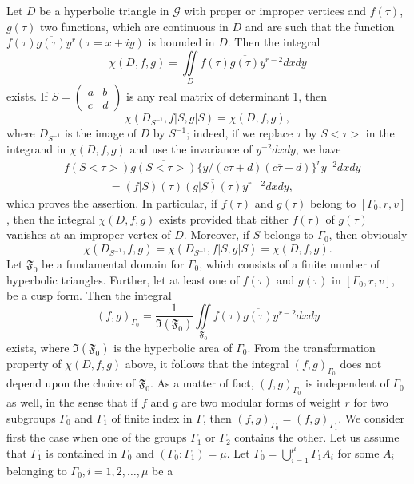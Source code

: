 Let $D$ be a hyperbolic triangle in $\mathscr{G}$ with proper or
improper vertices and $f(\tau)$, $g(\tau)$ two functions, which are
continuous in $D$ and are such that the function
$f(\tau)\overline{g(\tau)}y^r(\tau =x+iy)$ is bounded in $D$. Then the
integral 
$$
\chi(D,f,g) = \iint\limits_D  f(\tau) \overline{g(\tau)} y^{r-2} dx dy
$$
exists. If $S=\left(\begin{smallmatrix}
a&b\\c&d \end{smallmatrix}\right)$ is any real matrix of determinant
1, then 
$$
\chi(D_{S^{-1}},f|S, g|S) = \chi (D,f,g),
$$
where $D_{S^{-1}}$ is the image of $D$ by $S^{-1}$; indeed, if we
replace $\tau$ by $S<\tau>$ in the integrand in $\chi(D,f,g)$ and use
the invariance of $y^{-2}dx dy$, we have 
\begin{align*}
&f(S<\tau>) \overline{g(S<\tau>)} \{y/(c\tau+d)(c\overline{\tau}+d)\}^r
y^{-2} dx dy\\
&\qquad\qquad= (f|S) (\tau)\overline{(g|S)(\tau)} y^{r-2} dx dy, 
\end{align*}\pageoriginale 
which proves the assertion. In particular, if $f(\tau)$ and $g(\tau)$
belong to $[\Gamma_0, r, v]$, then the integral $\chi(D,f,g)$ exists
provided that either $f(\tau)$ of $g(\tau)$ vanishes at an improper
vertex of $D$. Moreover, if $S$ belongs to $\Gamma_0$, then obviously
$$
\chi(D_{S^{-1}},f,g)=\chi(D_{S^{-1}},f|S, g|S) = \chi (D,f,g).
$$
Let $\mathfrak{F}_0$ be a fundamental domain for $\Gamma_0$, which
consists of a finite number of hyperbolic triangles. Further, let at
least one of $f(\tau)$ and $g(\tau)$ in $[\Gamma_0,r,v]$, be a cusp
form. Then the integral 
$$
(f,g)_{\Gamma_0} = \frac{1}{\mathfrak{I}(\mathfrak{F_0})} 
\iint\limits_{\mathfrak{F}_0} f(\tau) \overline{g(\tau)} y^{r-2} dx dy
$$
exists, where $\mathfrak{I}(\mathfrak{F}_0)$ is the hyperbolic area of
$\Gamma_0$. From the transformation property of $\chi(D,f,g)$ above,
it follows that the integral $(f,g)_{\Gamma_0}$ does not depend upon
the choice of $\mathfrak{F}_0$. As a matter of fact,
$(f,g)_{\Gamma_0}$ is independent of $\Gamma_0$ as well, in the sense
that if $f$ and $g$ are two modular forms of weight $r$ for two
subgroups $\Gamma_0$ and $\Gamma_1$ of finite index in $\Gamma$, then
$(f,g)_{\Gamma_0}=(f,g)_{\Gamma_1}$. We consider first the case when
one of the groups $\Gamma_1$ or $\Gamma_2$ contains the other. Let us
assume that $\Gamma_1$ is contained in $\Gamma_0$ and
$(\Gamma_0:\Gamma_1)=\mu$. Let $\Gamma_0 = \bigcup^{\mu}_{i=1}\Gamma_1
A_i$ for some $A_i$ belonging to $\Gamma_0, i=1,2,\ldots,\mu$ be a

